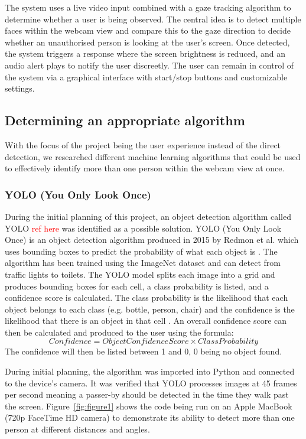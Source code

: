 \documentclass[12pt]{article}
\theoremstyle{plain}
\theoremstyle{definition}
\begin{document}
The system uses a live video input combined with a gaze tracking algorithm to determine whether a user is being observed. The central idea is to detect multiple faces within the webcam view and compare this to the gaze direction to decide whether an unauthorised person is looking at the user’s screen. Once detected, the system triggers a response where the screen brightness is reduced, and an audio alert plays to notify the user discreetly. The user can remain in control of the system via a graphical interface with start/stop buttons and customizable settings.

\subsection{Determining an appropriate algorithm}
\label{Determining an appropriate algorithm}

With the focus of the project being the user experience instead of the direct detection, we researched different machine learning algorithms that could be used to effectively identify more than one person within the webcam view at once.

\subsubsection{YOLO (You Only Look Once)}
During the initial planning of this project, an object detection algorithm called YOLO \textcolor{red}{ref here} was identified as a possible solution. 
YOLO (You Only Look Once) is an object detection algorithm produced in 2015 by Redmon et al. which uses bounding boxes to predict the probability of what each object is \cite{redmon_you_2016}. The algorithm has been trained using the ImageNet dataset \cite{noauthor_imagenet_nodate} and can detect from traffic lights to toilets. The YOLO model splits each image into a grid and produces bounding boxes for each cell, a class probability is listed, and a confidence score is calculated. The class probability is the likelihood that each object belongs to each class (e.g. bottle, person, chair) and the confidence is the likelihood that there is an object in that cell \cite{redmon_you_2016}. An overall confidence score can then be calculated and produced to the user using the formula: 
\[
  Confidence = Object Confidence Score \times Class Probability
\]
The confidence will then be listed between 1 and 0, 0 being no object found.

During initial planning, the algorithm was imported into Python and connected to the device’s camera. It was verified that YOLO processes images at 45 frames per second \cite{redmon_you_2016} meaning a passer-by should be detected in the time they walk past the screen. Figure~\ref{fig:figure1} shows the code being run on an Apple MacBook (720p FaceTime HD camera) to demonstrate its ability to detect more than one person at different distances and angles.
\end{document}
